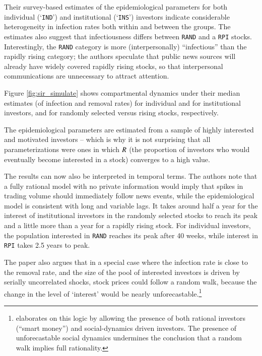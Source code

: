 Their survey-based estimates of the epidemiological parameters for both individual (`\texttt{IND}') and institutional (`\texttt{INS}') investors indicate considerable heterogeneity in infection rates both within and between the groups. The estimates also suggest that infectiousness differs between \texttt{RAND} and a \texttt{RPI} stocks. Interestingly, the \texttt{RAND} category is more (interpersonally) ``infectious'' than the rapidly rising category; the authors speculate that public news sources will already have widely covered rapidly rising stocks, so that interpersonal communications are unnecessary to attract attention.

Figure \ref{fig:sir_simulate} shows compartmental dynamics under their median estimates (of infection and removal rates) for individual and for institutional investors, and for randomly selected versus rising stocks, respectively.

The epidemiological parameters are estimated from a sample of highly interested and motivated investors -- which is why it is not surprising that all parameterizations were ones in which $\Recovered$ (the proportion of investors who would eventually become interested in a stock) converges to a high value.

The results can now also be interpreted in temporal terms.  The authors note that a fully rational model with no private information would imply that spikes in trading volume should immediately follow news events, while the epidemiological model is consistent with long and variable lags.  It takes around half a year for the interest of institutional investors in the randomly selected stocks to reach its peak and a little more than a year for a rapidly rising stock. For individual investors, the population interested in \texttt{RAND} reaches its peak after 40 weeks, while interest in \texttt{RPI} takes 2.5 years to peak.

The paper also argues that in a special case where the infection rate is close to the removal rate, and the size of the pool of interested investors is driven by serially uncorrelated shocks, stock prices could follow a random walk, because the change in the level of `interest' would be nearly unforecastable.\footnote{\cite{shiller1984stock} elaborates on this logic by allowing the presence of both rational investors (``smart money'') and social-dynamics driven investors. The presence of unforecastable social dynamics undermines the conclusion that a random walk implies full rationality.} %

